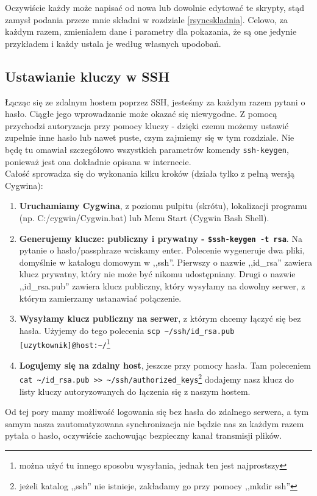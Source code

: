 Oczywiście każdy może napisać od nowa lub dowolnie edytować te skrypty, stąd zamysł podania przeze mnie składni w rozdziale \ref{rsyncskladnia}. Celowo, za każdym razem, zmieniałem dane i parametry dla pokazania, że są one jedynie przykładem i każdy ustala je według własnych upodobań.

\subsection{Ustawianie kluczy w SSH}
Łącząc się ze zdalnym hostem poprzez SSH, jesteśmy za każdym razem pytani o hasło. Ciągłe jego wprowadzanie może okazać się niewygodne. Z pomocą przychodzi autoryzacja przy pomocy kluczy - dzięki czemu możemy ustawić zupełnie inne hasło lub nawet puste, czym zajmiemy się w tym rozdziale. Nie będę tu omawiał szczegółowo wszystkich parametrów komendy \verb|ssh-keygen|, ponieważ jest ona dokładnie opisana w internecie\cite{8}.
\\Całość sprowadza się do wykonania kilku kroków (działa tylko z pełną wersją Cygwina):
\begin{enumerate}
\item {\bf Uruchamiamy Cygwina}, z poziomu pulpitu (skrótu), lokalizacji programu (np. C:/cygwin/Cygwin.bat) lub Menu Start (Cygwin Bash Shell).
\item {\bf Generujemy klucze: publiczny i prywatny - \verb|$ssh-keygen -t rsa|}. Na pytanie o hasło/passphraze wciskamy enter. Polecenie wygeneruje dwa pliki, domyślnie w katalogu domowym w ,,ssh''. Pierwszy o nazwie ,,id\_rsa'' zawiera klucz prywatny, który nie może być nikomu udostępniany. Drugi o nazwie ,,id\_rsa.pub'' zawiera klucz publiczny, który wysyłamy na dowolny serwer, z którym zamierzamy ustanawiać połączenie.

\item {\bf Wysyłamy klucz publiczny na serwer}, z którym chcemy łączyć się bez hasła. Użyjemy do tego polecenia \verb|scp ~/ssh/id_rsa.pub [uzytkownik]@host:~/|\footnote{można użyć tu innego sposobu wysyłania, jednak ten jest najprostszy}

\item {\bf Logujemy się na zdalny host}, jeszcze przy pomocy hasła. Tam poleceniem \verb|cat ~/id_rsa.pub >> ~/ssh/authorized_keys|\footnote{jeżeli katalog ,,ssh'' nie istnieje, zakładamy go przy pomocy ,,mkdir ssh''} dodajemy nasz klucz do listy kluczy autoryzowanych do łączenia się z naszym hostem.
\end{enumerate}
Od tej pory mamy możliwość logowania się bez hasła do zdalnego serwera, a tym samym nasza zautomatyzowana synchronizacja nie będzie nas za każdym razem pytała o hasło, oczywiście zachowując bezpieczny kanał transmisji plików.


